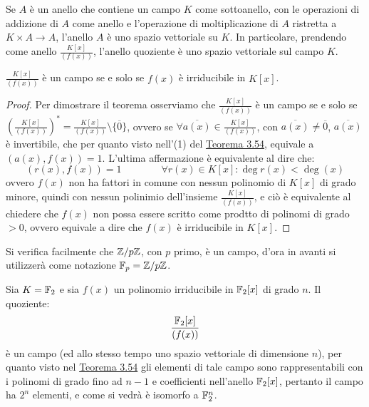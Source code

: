 \documentclass[11pt]{scrartcl}
\begin{document}
\begin{remark}
Se $A$ è un anello che contiene un campo $K$ come sottoanello, con le operazioni di addizione di $A$ come anello e l'operazione di moltiplicazione di $A$ ristretta a $K \times A \longrightarrow A$, l'anello $A$ è uno spazio vettoriale su $K$. In particolare, prendendo come anello $\frac{K[x]}{(f(x))}$, l'anello quoziente è uno spazio vettoriale sul campo $K$.
\end{remark}

\begin{corollary}
$\frac{K[x]}{(f(x))}$ è un campo se e solo se $f(x)$ è irriducibile in $K[x]$.
\end{corollary}

\begin{proof}
Per dimostrare il teorema osserviamo che $\frac{K[x]}{(f(x))}$ è un campo se e solo se $\left(\frac{K[x]}{(f(x))}\right)^* = \frac{K[x]}{(f(x))}\setminus\{\overline0\}$,
ovvero se $\forall \overline{a(x)} \in \frac{K[x]}{(f(x))}$, con $\overline{a(x)} \ne \overline 0$, $\overline{a(x)}$ è invertibile, che per quanto visto nell'(1) del 
\hyperref[p:3.54]{Teorema 3.54}, equivale a $(a(x),f(x)) = 1$. L'ultima affermazione è equivalente al dire che:
	\[ (r(x),f(x)) = 1
	\qquad\qquad
	\forall r(x) \in K[x]: \deg r(x) < \deg(x)
		\]
	ovvero $f(x)$ non ha fattori in comune con nessun polinomio di $K[x]$ di grado minore, quindi con nessun polinimio dell'insieme $\frac{K[x]}{(f(x))}$,
	e ciò è equivalente al chiedere che $f(x)$ non possa essere scritto come prodtto di polinomi di grado $>0$, ovvero equivale a dire che $f(x)$ è irriducibile in $K[x]$.
\end{proof}

\begin{remark}
Si verifica facilmente che ${\mathbb Z}/p{\mathbb Z}$, con $p$ primo, è un campo, d'ora in avanti si utilizzerà come notazione ${\mathbb F}_p = {\mathbb Z}/p{\mathbb Z}$.
\end{remark}

\begin{example}
Sia $K=\mathbb F_2$ e sia $f(x)$ un polinomio irriducibile in $\mathbb F_2[x]$ di grado $n$. Il quoziente:
	\[ \frac{\mathbb F_2[x]}{(f(x))}
	\]
è un campo (ed allo stesso tempo uno spazio vettoriale di dimensione $n$), per quanto visto nel \hyperref[p:3.53]{Teorema 3.54} gli elementi di tale campo sono rappresentabili con i polinomi di grado fino ad $n-1$ e coefficienti nell'anello $\mathbb F_2[x]$, pertanto il campo ha $2^n$ elementi, e come si vedrà è isomorfo a $\mathbb F_2^n$.
\end{example}
\end{document}
